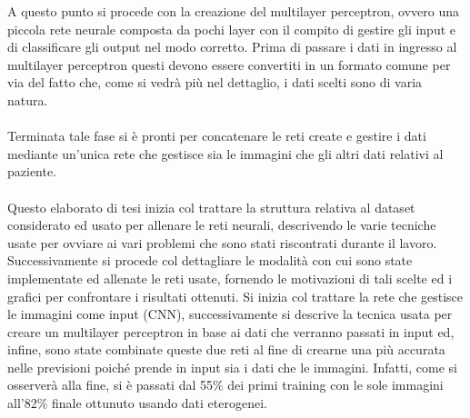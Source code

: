 A questo punto si procede con la creazione del multilayer perceptron, ovvero una piccola rete neurale composta da pochi layer con il compito 
di gestire gli input e di classificare gli output nel modo corretto.
Prima di passare i dati in ingresso al multilayer perceptron questi devono essere convertiti in un formato comune per via del fatto che, come si vedrà 
più nel dettaglio, i dati scelti sono di varia natura.
\\\\
Terminata tale fase si è pronti per concatenare le reti create e gestire i dati mediante un'unica rete che gestisce sia le immagini che gli altri dati 
relativi al paziente.
\\\\
Questo elaborato di tesi inizia col trattare la struttura relativa al dataset considerato ed usato per allenare le 
reti neurali, descrivendo le varie tecniche usate per ovviare ai vari problemi che sono stati riscontrati durante il lavoro.
Successivamente si procede col dettagliare le modalità con cui sono state implementate ed allenate le reti usate, fornendo le motivazioni
di tali scelte ed i grafici per confrontare i risultati ottenuti.
Si inizia col trattare la rete che gestisce le immagini come input (CNN), successivamente si descrive la tecnica usata per creare 
un multilayer perceptron in base ai dati che verranno passati in input ed, infine, sono state combinate queste due reti al fine 
di crearne una più accurata nelle previsioni poiché prende in input sia i dati che le immagini.  
Infatti, come si osserverà alla fine, si è passati dal 55\% dei primi training con le sole immagini all'82\%
finale ottunuto usando dati eterogenei.